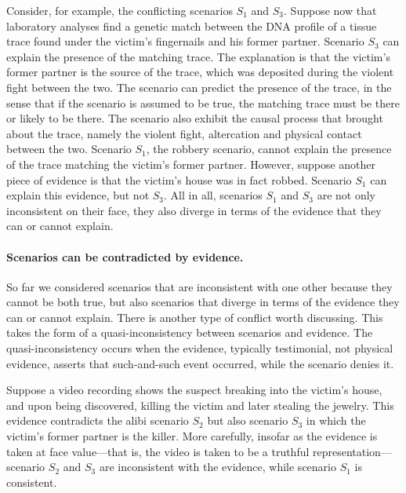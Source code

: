 \documentclass[10pt]{article}
\begin{document}

Consider, for example, the conflicting scenarios $S_1$ and $S_3$.
Suppose now that laboratory analyses find a genetic match between the DNA profile of a tissue trace found under 
the victim's fingernails and his former partner. Scenario $S_3$ can explain the presence of the matching trace. The explanation is that the victim's former partner is the 
source of the trace, which was deposited during the violent fight between the two. The scenario can predict 
the presence of the trace, in the sense that if the scenario is assumed to be true, the matching trace must be there or 
likely to be there. The scenario also exhibit the causal process that brought about the trace, namely the violent fight, altercation 
and physical contact between the two.  Scenario $S_1$, the robbery scenario, cannot explain the presence of the trace matching the victim's former partner. 
However, suppose another piece of evidence 
is that the victim's house was in fact robbed. Scenario $S_1$ can explain this evidence, but not $S_3$. All in all, scenarios $S_1$ and $S_3$ 
are not only inconsistent on their face, they also diverge
in terms of the evidence that they can or cannot explain.

\paragraph{Scenarios can be contradicted by evidence.} So far we considered scenarios that are 
inconsistent with one other because 
they cannot be both true, but also scenarios that diverge in terms of 
the evidence they can or cannot explain. There is another type of conflict worth discussing. This takes the form of 
a quasi-inconsistency between scenarios and  evidence. The quasi-inconsistency occurs when the evidence, 
typically testimonial, not physical evidence, asserts that such-and-such event occurred, while the scenario 
denies it. 

Suppose a video recording shows the suspect 
breaking into the victim's house, and upon being discovered, 
killing the victim and later stealing the jewelry. 
This evidence contradicts the alibi scenario $S_2$ but also scenario $S_3$ 
in which the victim's former partner is the killer.  More carefully, insofar as the evidence 
is taken at face value---that is, the video is taken to be a truthful representation---scenario $S_2$ and $S_3$ 
are inconsistent with the evidence, while scenario $S_1$ is consistent. 
\end{document}
